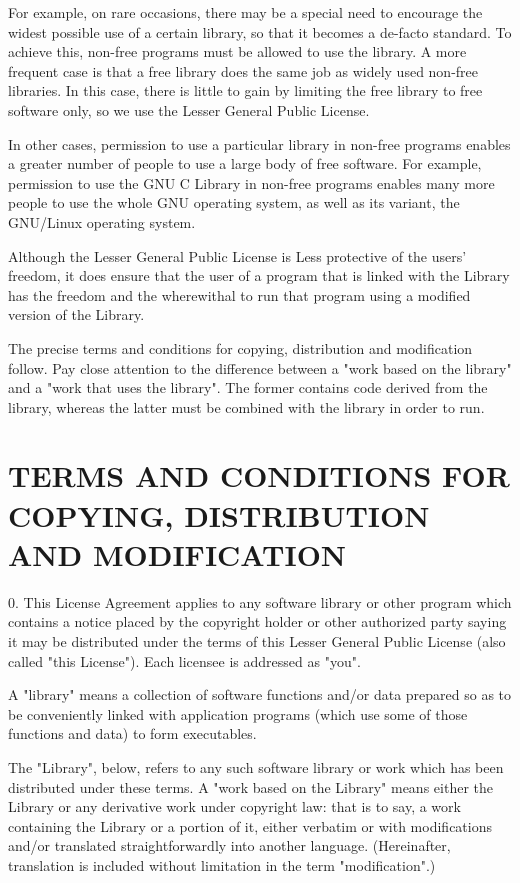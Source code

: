 For example, on rare occasions, there may be a special need to encourage the
widest possible use of a certain library, so that it becomes a de-facto
standard.  To achieve this, non-free programs must be allowed to use the
library.  A more frequent case is that a free library does the same job as
widely used non-free libraries.  In this case, there is little to gain by
limiting the free library to free software only, so we use the Lesser General
Public License.

In other cases, permission to use a particular library in non-free programs
enables a greater number of people to use a large body of free software.  For
example, permission to use the GNU C Library in non-free programs enables
many more people to use the whole GNU operating system, as well as its
variant, the GNU/Linux operating system.

Although the Lesser General Public License is Less protective of the users'
freedom, it does ensure that the user of a program that is linked with the
Library has the freedom and the wherewithal to run that program using a
modified version of the Library.

The precise terms and conditions for copying, distribution and modification
follow.  Pay close attention to the difference between a "work based on the
library" and a "work that uses the library".  The former contains code
derived from the library, whereas the latter must be combined with the
library in order to run.

\section*{TERMS AND CONDITIONS FOR COPYING, DISTRIBUTION AND MODIFICATION}

0. This License Agreement applies to any software library or other program
which contains a notice placed by the copyright holder or other authorized
party saying it may be distributed under the terms of this Lesser General
Public License (also called "this License").  Each licensee is addressed as
"you".

A "library" means a collection of software functions and/or data prepared so
as to be conveniently linked with application programs (which use some of
those functions and data) to form executables.

The "Library", below, refers to any such software library or work which has
been distributed under these terms.  A "work based on the Library" means
either the Library or any derivative work under copyright law: that is to
say, a work containing the Library or a portion of it, either verbatim or
with modifications and/or translated straightforwardly into another language.
(Hereinafter, translation is included without limitation in the term
"modification".)

